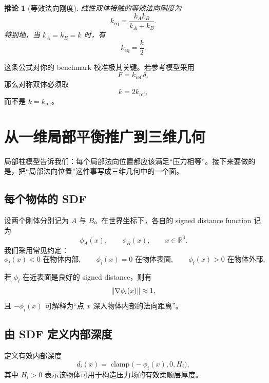 \documentclass[12pt,a4paper]{ctexart}
\newtheorem{corollary}{推论}
\begin{document}
\begin{corollary}[等效法向刚度]
线性双体接触的等效法向刚度为
\begin{equation}
    k_{\mathrm{eq}}=\frac{k_Ak_B}{k_A+k_B}.
\end{equation}
特别地，当 $k_A=k_B=k$ 时，有
\begin{equation}
    k_{\mathrm{eq}}=\frac{k}{2}.
\end{equation}
\end{corollary}

这条公式对你的 benchmark 校准极其关键。若参考模型采用
\begin{equation}
    F = k_{\mathrm{ref}}\,\delta,
\end{equation}
那么对称双体必须取
\begin{equation}
    k = 2k_{\mathrm{ref}},
\end{equation}
而不是 $k=k_{\mathrm{ref}}$。

\section{从一维局部平衡推广到三维几何}

局部柱模型告诉我们：每个局部法向位置都应该满足“压力相等”。接下来要做的是，把“局部法向位置”这件事写成三维几何中的一个面。

\subsection{每个物体的 SDF}
设两个刚体分别记为 $A$ 与 $B$。在世界坐标下，各自的 signed distance function 记为
\begin{equation}
    \phi_A(x), \qquad \phi_B(x), \qquad x\in\mathbb R^3.
\end{equation}
我们采用常见约定：
\begin{equation}
    \phi_i(x)<0 \text{ 在物体内部},
    \qquad
    \phi_i(x)=0 \text{ 在物体表面},
    \qquad
    \phi_i(x)>0 \text{ 在物体外部}.
\end{equation}

若 $\phi_i$ 在近表面是良好的 signed distance，则有
\begin{equation}
    \norm{\nabla \phi_i(x)}\approx 1,
\end{equation}
且 $-\phi_i(x)$ 可解释为“点 $x$ 深入物体内部的法向距离”。

\subsection{由 SDF 定义内部深度}
定义有效内部深度
\begin{equation}
    d_i(x)=\operatorname{clamp}\bigl(-\phi_i(x),0,H_i\bigr),
\end{equation}
其中 $H_i>0$ 表示该物体可用于构造压力场的有效柔顺层厚度。
\end{document}
